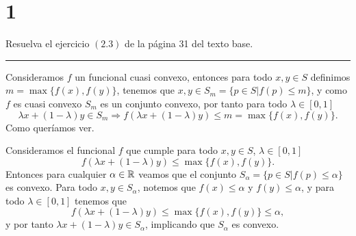 \section*{1}

Resuelva el ejercicio $(2.3)$ de la página 31 del texto base.

\noindent\rule{10cm}{0.4pt}

Consideramos $f$ un funcional cuasi convexo,
entonces para todo $x, y \in S$ definimos $m = \max \{ f(x), f(y) \}$,
tenemos que $x, y \in S_m = \{ p \in S | f(p) \leq m \}$,
y como $f$ es cuasi convexo $S_m$ es un conjunto convexo,
por tanto para todo $\lambda \in [0, 1]$
\begin{equation*}
    \lambda x + (1 - \lambda) y \in S_m \Rightarrow f(\lambda x + (1 - \lambda) y) \leq m = \max \{ f(x), f(y) \}.
\end{equation*}
Como queríamos ver.

Consideramos el funcional $f$ que cumple para todo $x, y \in S$, $\lambda \in [0,1]$
\begin{equation*}
    f(\lambda x + (1 - \lambda) y) \leq \max \{ f(x), f(y) \}.
\end{equation*}
Entonces para cualquier $\alpha \in \mathbb{R}$ veamos que el conjunto $S_\alpha =  \{ p \in S | f(p) \leq \alpha \}$ es convexo.
Para todo $x, y \in S_\alpha$, notemos que $f(x) \leq \alpha$ y $f(y) \leq \alpha$,
y para todo $\lambda \in [0,1]$ tenemos que
\begin{equation*}
    f(\lambda x + (1 - \lambda) y) \leq \max \{ f(x), f(y) \} \leq \alpha,
\end{equation*}
y por tanto $\lambda x + (1 - \lambda) y \in S_\alpha$, implicando que $S_\alpha$ es convexo.
